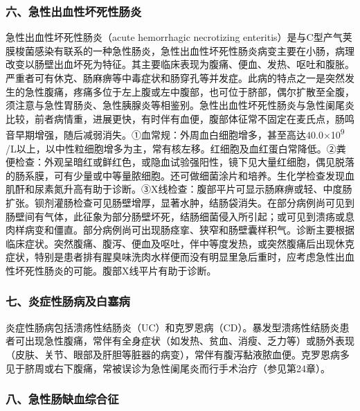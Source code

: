 \subsubsection{六、急性出血性坏死性肠炎}

急性出血性坏死性肠炎（acute hemorrhagic necrotizing
enteritis）是与C型产气荚膜梭菌感染有联系的一种急性肠炎，急性出血性坏死性肠炎病变主要在小肠，病理改变以肠壁出血坏死为特征。其主要临床表现为腹痛、便血、发热、呕吐和腹胀。严重者可有休克、肠麻痹等中毒症状和肠穿孔等并发症。此病的特点之一是突然发生的急性腹痛，疼痛多位于左上腹或左中腹部，也可位于脐部，偶尔扩散至全腹，须注意与急性胃肠炎、急性胰腺炎等相鉴别。急性出血性坏死性肠炎与急性阑尾炎比较，前者病情重，进展更快，有时伴有血便，腹部体征常不固定在麦氏点，肠鸣音早期增强，随后减弱消失。①血常规：外周血白细胞增多，甚至高达40.0×10\textsuperscript{9}
/L以上，以中性粒细胞增多为主，常有核左移。红细胞及血红蛋白常降低。②粪便检查：外观呈暗红或鲜红色，或隐血试验强阳性，镜下见大量红细胞，偶见脱落的肠系膜，可有少量或中等量脓细胞。还可做细菌涂片和培养。生化学检查发现血肌酐和尿素氮升高有助于诊断。③X线检查：腹部平片可显示肠麻痹或轻、中度肠扩张。钡剂灌肠检查可见肠壁增厚，显著水肿，结肠袋消失。在部分病例尚可见到肠壁间有气体，此征象为部分肠壁坏死，结肠细菌侵入所引起；或可见到溃疡或息肉样病变和僵直。部分病例尚可出现肠痉挛、狭窄和肠壁囊样积气。诊断主要根据临床症状。突然腹痛、腹泻、便血及呕吐，伴中等度发热，或突然腹痛后出现休克症状，特别是患者排有腥臭味洗肉水样便而没有明显里急后重时，应考虑急性出血性坏死性肠炎的可能。腹部X线平片有助于诊断。

\subsubsection{七、炎症性肠病及白塞病}

炎症性肠病包括溃疡性结肠炎（UC）和克罗恩病（CD）。暴发型溃疡性结肠炎患者可出现急性腹痛，常伴有全身症状（如发热、贫血、消瘦、乏力等）或肠外表现（皮肤、关节、眼部及肝胆等脏器的病变），常伴有腹泻黏液脓血便。克罗恩病多见于脐周或右下腹痛，常被误诊为急性阑尾炎而行手术治疗（参见第24章）。

\subsubsection{八、急性肠缺血综合征}

